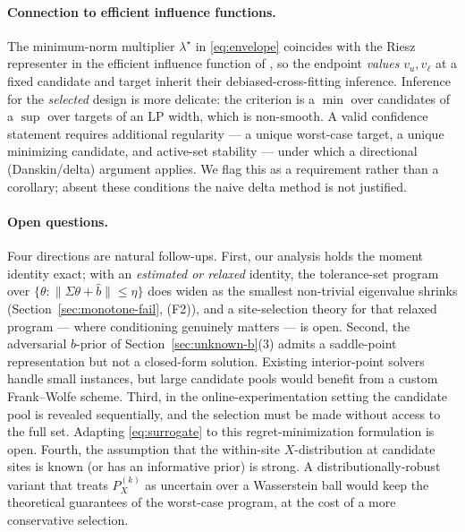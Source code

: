 \paragraph{Connection to efficient influence functions.}
The minimum-norm multiplier $\lambda^\star$ in \eqref{eq:envelope} coincides with
the Riesz representer in the efficient influence function of
\citet[Eq.~2.9]{boyarsky2026}, so the endpoint \emph{values} $v_u,v_\ell$ at a
fixed candidate and target inherit their debiased-cross-fitting inference.
Inference for the \emph{selected} design is more delicate: the criterion is a
$\min$ over candidates of a $\sup$ over targets of an LP width, which is
non-smooth. A valid confidence statement requires additional regularity --- a
unique worst-case target, a unique minimizing candidate, and active-set
stability --- under which a directional (Danskin/delta) argument applies. We flag
this as a requirement rather than a corollary; absent these conditions the naive
delta method is not justified.

\paragraph{Open questions.}
Four directions are natural follow-ups. First, our analysis holds the moment
identity exact; with an \emph{estimated or relaxed} identity, the tolerance-set
program over $\{\theta:\|\widehat\Sigma\theta+\widehat b\|\le\eta\}$ does widen
as the smallest non-trivial eigenvalue shrinks (Section~\ref{sec:monotone-fail},
(F2)), and a site-selection theory for that relaxed program --- where
conditioning genuinely matters --- is open. Second, the adversarial $b$-prior of
Section~\ref{sec:unknown-b}(3) admits a saddle-point representation but not a
closed-form solution. Existing interior-point solvers handle small instances,
but large candidate pools would benefit from a custom Frank--Wolfe scheme.
Third, in the online-experimentation setting the candidate pool is revealed
sequentially, and the selection must be made without access to the full set.
Adapting \eqref{eq:surrogate} to this regret-minimization formulation is open.
Fourth, the assumption that the within-site $X$-distribution at candidate sites
is known (or has an informative prior) is strong. A distributionally-robust
variant that treats $P_X^{(k)}$ as uncertain over a Wasserstein ball would keep
the theoretical guarantees of the \citet{jeong2020assessing} worst-case program,
at the cost of a more conservative selection.
